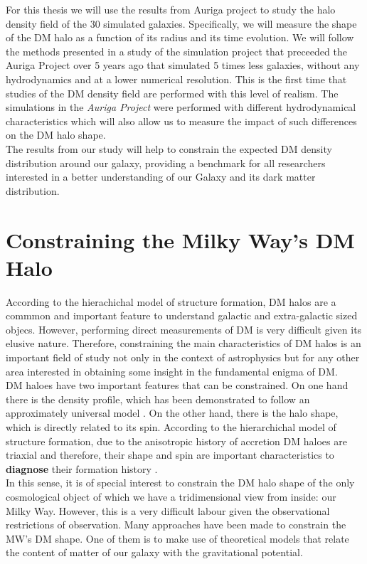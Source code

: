 For this thesis we will use the results from Auriga project \cite{auriga} to study the halo density field of the 30 simulated galaxies.
Specifically, we will measure the shape of the DM halo as a function of its radius and its time evolution.
We will follow the methods presented in a study of the simulation project that preceeded the Auriga Project over 5 years ago \cite{Vera-Ciro2011} that simulated 5 times less galaxies, without any hydrodynamics and at a lower numerical resolution. 
This is the first time that studies of the DM density field are performed with this level of realism.
The simulations in the \emph{Auriga Project} were performed with different hydrodynamical characteristics 
which will also allow us to measure the impact of such differences on the DM halo shape.\\

The results from our study will help to constrain the expected DM density distribution around our galaxy, 
providing a benchmark for all researchers interested in a better understanding of our Galaxy and its 
dark matter distribution.

\section{Constraining the Milky Way's DM Halo}
According to the hierachichal model of structure formation, DM halos are a commmon and important feature to understand galactic and extra-galactic sized objecs. 
However, performing direct measurements of DM is very difficult given its elusive nature. 
Therefore, constraining the main characteristics of DM halos is an important field of study not only in the context of astrophysics but for any other area interested in obtaining some insight in the fundamental enigma of DM.\\

DM haloes have two important features that can be constrained. 
On one hand there is the density profile, which has been demonstrated to follow an approximately universal model \cite{Navarro et al. 2010}. 
On the other hand, there is the halo shape, which is directly related to its spin. 
According to the hierarchichal model of structure formation, due to the anisotropic history of accretion DM haloes are triaxial and therefore, their shape and spin are important characteristics to \textbf{diagnose} their formation history \cite{Bardeen et al. 1986}.\\

In this sense, it is of special interest to constrain the DM halo shape of the only cosmological object of which we have a tridimensional view from inside: our Milky Way. However, this is a very difficult labour given the observational restrictions of observation. Many approaches have been made to constrain the MW's DM shape. One of them is to make use of theoretical models that relate the content of matter of our galaxy with the gravitational potential.\\

